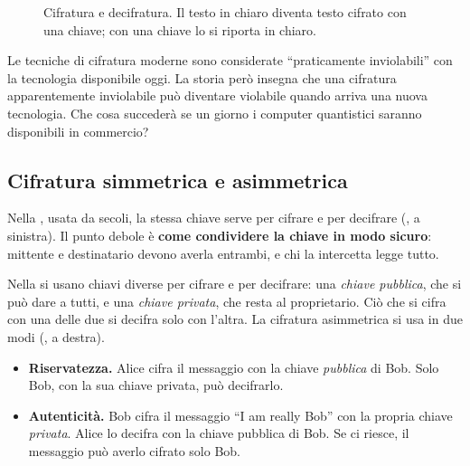 \begin{figure}[ht]
\centering
{}
\caption{Cifratura e decifratura. Il testo in chiaro diventa testo cifrato con una chiave; con una chiave lo si
riporta in chiaro.}
\label{fig:sic-cifratura}
\end{figure}

Le tecniche di cifratura moderne sono considerate ``praticamente inviolabili'' con la tecnologia disponibile oggi. La
storia però insegna che una cifratura apparentemente inviolabile può diventare violabile quando arriva una nuova
tecnologia. Che cosa succederà se un giorno i computer quantistici saranno disponibili in commercio?

\subsection{Cifratura simmetrica e asimmetrica}

Nella , usata da secoli, la stessa chiave serve per cifrare e per decifrare
(, a sinistra). Il punto debole è \textbf{come condividere la chiave in modo sicuro}:
mittente e destinatario devono averla entrambi, e chi la intercetta legge tutto.

Nella  si usano chiavi diverse per cifrare e per decifrare: una \emph{chiave pubblica},
che si può dare a tutti, e una \emph{chiave privata}, che resta al proprietario. Ciò che si cifra con una delle due si
decifra solo con l'altra. La cifratura asimmetrica si usa in due modi (, a destra).
\begin{itemize}
  \item \textbf{Riservatezza.} Alice cifra il messaggio con la chiave \emph{pubblica} di Bob. Solo Bob, con la sua
    chiave privata, può decifrarlo.
  \item \textbf{Autenticità.} Bob cifra il messaggio ``I am really Bob'' con la propria chiave \emph{privata}. Alice lo
    decifra con la chiave pubblica di Bob. Se ci riesce, il messaggio può averlo cifrato solo Bob.
\end{itemize}

